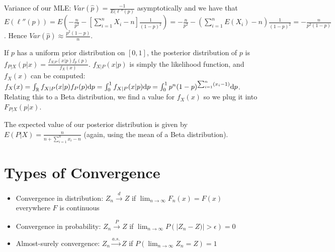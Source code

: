 \documentclass[letterpaper, 8pt]{extarticle}
\begin{document}
\begin{multicols*}{3}
\begin{enumerate}[label=\alph*), wide, labelwidth=0pt, labelindent=0pt]
		Variance of our MLE: $Var(\hat p)=\frac{-1}{E(\ell''(p)}$ asymptotically and we have that $E(\ell''(p))=E\left(-\frac{n}{p^2}-\left[\sum_{i=1}^nX_i-n\right]\frac{1}{(1-p)^2}\right)=-\frac{n}{p^2}-\left(\sum_{i=1}^nE(X_i)-n\right)\frac{1}{(1-p)^2}=-\frac{n}{p^2(1-p)}$. Hence $Var(\hat p)\approx\frac{p^2(1-p)}{n}$.
		
		If $p$ has a uniform prior distribution on $[0,1]$, the posterior distribution of $p$ is $f_{P|X}(p|x)=\frac{f_{X|P}(x|p)f_p(p)}{f_X(x)}$. $f_{X|P}(x|p)$ is simply the likelihood function, and $f_X(x)$ can be computed: $f_X(x)=\int_\mathbb R f_{X|P}(x|p)f_P(p)\dd p=\int_0^1f_{X|P}(x|p)\dd p=\int_0^1p^n(1-p)^{\sum_{i=1}^n(x_i-1)}\dd p$. Relating this to a Beta distribution, we find a value for $f_X(x)$ so we plug it into $F_{P|X}(p|x)$.
		
		The expected value of our posterior distribution is given by $E(P|X)=\frac{n}{n+\sum_{i=1}^nx_i-n}$ (again, using the mean of a Beta distribution).
	\end{enumerate}
	
	\newpage
	\section{Types of Convergence}
	\begin{itemize}
		\item Convergence in distribution: $Z_n\overset{d}{\to}Z$ if $\displaystyle\lim_{n\to\infty}F_n(x)=F(x)$ everywhere $F$ is continuous
		\item Convergence in probability: $Z_n\overset{P}{\to}Z$ if $\displaystyle\lim_{n\to\infty}P(|Z_n-Z)|>\epsilon)=0$
		\item Almost-surely convergence: $Z_n\overset{a.s.}{\to}Z$ if $P(\displaystyle\lim_{n\to\infty}Z_n=Z)=1$
	\end{itemize}

\end{multicols*}
\end{document}
